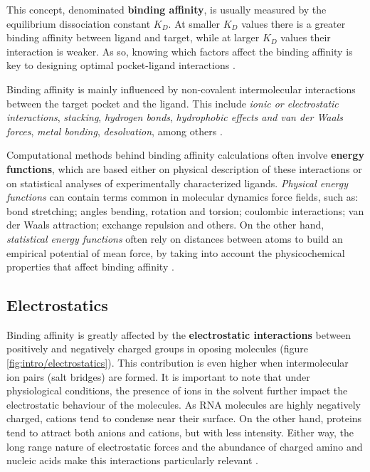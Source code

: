    This concept, denominated \textbf{binding affinity}, is usually measured by the equilibrium dissociation constant $K_D$. At smaller $K_D$ values there is a greater binding affinity between ligand and target, while at larger $K_D$ values their interaction is weaker. As so, knowing which factors affect the binding affinity is key to designing optimal pocket-ligand interactions \cite{binding_affinity_web}.

    Binding affinity is mainly influenced by non-covalent intermolecular interactions between the target pocket and the ligand. This include \textit{ionic or electrostatic interactions}, \textit{stacking}, \textit{hydrogen bonds}, \textit{hydrophobic effects and van der Waals forces}, \textit{metal bonding}, \textit{desolvation}, among others \cite{binding_affinity_2016, binding_affinity_web, electrostatics_2020, stacking_binding_2020, stacking_trp_2022, hbonds_2023, hydrophobic_2017, hydrophobic_2022}.

    Computational methods behind binding affinity calculations often involve \textbf{energy functions}, which are based either on physical description of these interactions or on statistical analyses of experimentally characterized ligands. \textit{Physical energy functions} can contain terms common in molecular dynamics force fields, such as: bond stretching; angles bending, rotation and torsion; coulombic interactions; van der Waals attraction; exchange repulsion and others. On the other hand, \textit{statistical energy functions} often rely on distances between atoms to build an empirical potential of mean force, by taking into account the physicochemical properties that affect binding affinity \cite{binding_affinity_2016}.

  \subsection{Electrostatics}
    Binding affinity is greatly affected by the \textbf{electrostatic interactions} between positively and negatively charged groups in oposing molecules (figure \ref{fig:intro/electrostatics}). This contribution is even higher when intermolecular ion pairs (salt bridges) are formed. It is important to note that under physiological conditions, the presence of ions in the solvent further impact the electrostatic behaviour of the molecules. As RNA molecules are highly negatively charged, cations tend to condense near their surface. On the other hand, proteins tend to attract both anions and cations, but with less intensity. Either way, the long range nature of electrostatic forces and the abundance of charged amino and nucleic acids make this interactions particularly relevant \cite{electrostatics_2020, electrostatics_2019, apbs_2004}.

